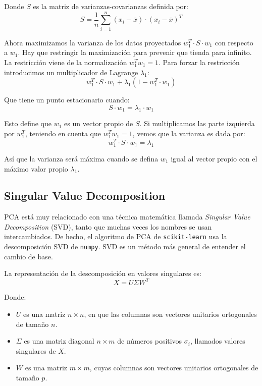 \documentclass[11pt,spanish,listoffigures,listoftables]{tfgetsinf}
\begin{document}
   Donde \(S\) es la matriz de varianzas-covarianzas definida por:
   \begin{equation}
   S=\frac{1}{n}\sum_{i=1}^{n}(x_{i}-\overline{x})\cdot (x_{i}-\overline{x})^{T}
   \end{equation}
   
   Ahora maximizamos la varianza de los datos proyectados \(w_{1}^{T}\cdot S\cdot w_{1}\) con respecto a \(w_{1}\). Hay que restringir la maximización para prevenir que tienda para infinito. La restricción viene de la normalización \(w_{1}^{T}w_{1}=1\). Para forzar la restricción introducimos un multiplicador de Lagrange \(\lambda_{1}\):
   \begin{equation}
   w_{1}^{T}\cdot S\cdot w_{1} + \lambda_{1} (1 - w_{1}^{T}\cdot w_{1})
   \end{equation}
   
   Que tiene un punto estacionario cuando:
   \begin{equation}
   S\cdot w_{1} = \lambda_{1} \cdot w_{1}
   \end{equation}
   
   Esto define que \(w_{1}\) es un vector propio de \(S\). Si multiplicamos las parte izquierda por \(w_{1}^{T}\), teniendo en cuenta que \(w_{1}^{T}w_{1}=1\), vemos que la varianza es dada por:
   \begin{equation}
   w_{1}^{T}\cdot S\cdot w_{1} = \lambda_{1} 
   \end{equation}
   
   Así que la varianza será máxima cuando se defina \(w_{1}\) igual al vector propio con el máximo valor propio \(\lambda_{1}\).
   
    \subsection{Singular Value Decomposition}
    PCA está muy relacionado con una técnica matemática llamada {\em Singular Value Decomposition} (SVD), tanto que muchas veces los nombres se usan intercambiados. De hecho, el algoritmo de PCA de {\tt scikit-learn} usa la descomposición SVD de {\tt numpy}. SVD es un método más general de entender el cambio de base.
    
    La representación de la descomposición en valores singulares es:
    \begin{equation}
    X = U \Sigma W^{T}
    \end{equation}
    
    Donde:
    \begin{itemize}
    \item \(U\) es una matriz \(n \times n\), en que las columnas son vectores unitarios ortogonales de tamaño \(n\).
    \item \(\Sigma\) es una matriz diagonal \(n \times m\) de números positivos \(\sigma_{i}\), llamados valores singulares de \(X\).
    \item \(W\) es una matriz \(m \times m\), cuyas columnas son vectores unitarios ortogonales de tamaño \(p\).
    \end{itemize}
    
\end{document}
